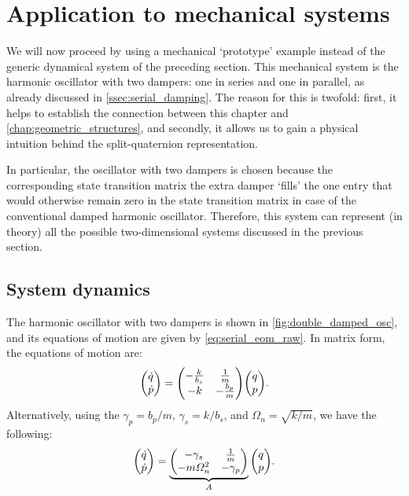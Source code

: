 \section{Application to mechanical systems}
\label{sec:mechanical}
We will now proceed by using a mechanical `prototype' example instead of the generic dynamical system of the preceding section. This mechanical system is the harmonic oscillator with two dampers: one in series and one in parallel, as already discussed in \cref{ssec:serial_damping}. The reason for this is twofold: first, it helps to establish the connection between this chapter and \cref{chap:geometric_structures}, and secondly, it allows us to gain a physical intuition behind the split-quaternion representation. 

In particular, the oscillator with two dampers is chosen because the corresponding state transition matrix the extra damper `fills' the one entry that would otherwise remain zero in the state transition matrix in case of the conventional damped harmonic oscillator. Therefore, this system can represent (in theory) all the possible two-dimensional systems discussed in the previous section.

\subsection{System dynamics}
The harmonic oscillator with two dampers is shown in \cref{fig:double_damped_osc}, and its equations of motion are given by \cref{eq:serial_eom_raw}. In matrix form, the equations of motion are:
\begin{equation*}
    \mqty(\dot{q}\\\dot{p}) = \mqty(-\tfrac{k}{b_s} & \tfrac{1}{m} \\ -k & - \tfrac{b_p}{m})\mqty(q \\ p).
\end{equation*}
Alternatively, using the \(\gamma_p = b_p/m\), \(\gamma_s = k/b_s\), and \(\Omega_n = \sqrt{k/m}\), we have the following:
\begin{equation}
    \mqty(\dot{q}\\\dot{p}) = \underbrace{\mqty(-\gamma_s & \frac{1}{m} \\ -m\Omega_n^2 & - \gamma_p)}_A \mqty(q \\ p).
    \label{eq:ddho_eom}
\end{equation}


